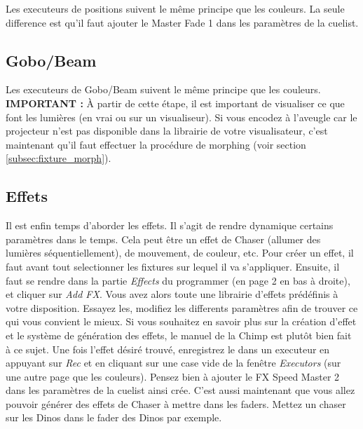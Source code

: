 Les executeurs de positions suivent le même principe que les couleurs. La seule
difference est qu'il faut ajouter le Master Fade 1 dans les paramètres de la cuelist.

\subsection{Gobo/Beam}
\label{subsec:exec_gobo_beam}

Les executeurs de Gobo/Beam suivent le même principe que les couleurs.
\newline
\newline
\textbf{IMPORTANT :} À partir de cette étape, il est important de visualiser ce que font les lumières (en vrai ou sur un visualiseur).
Si vous encodez à l'aveugle car le projecteur n'est pas disponible dans la librairie de votre visualisateur, c'est maintenant qu'il faut effectuer la procédure de morphing (voir section \ref{subsec:fixture_morph}).

\subsection{Effets}
\label{subsec:exec_effets}

Il est enfin temps d'aborder les effets.
\newline
Il s'agit de rendre dynamique certains paramètres dans le temps. Cela peut être un effet de Chaser (allumer des lumières séquentiellement), de mouvement, de couleur, etc.
\newline
\newline
Pour créer un effet, il faut avant tout selectionner les fixtures sur lequel il va s'appliquer.
Ensuite, il faut se rendre dans la partie \textit{Effects} du programmer (en page 2 en bas à droite),
et cliquer sur \textit{Add FX}. Vous avez alors toute une librairie d'effets prédéfinis à votre disposition.
Essayez les, modifiez les differents paramètres afin de trouver ce qui vous convient le mieux. Si vous
souhaitez en savoir plus sur la création d'effet et le système de génération des effets, le manuel de la Chimp est plutôt bien fait à ce sujet.
Une fois l'effet désiré trouvé, enregistrez le dans un executeur en appuyant sur \textit{Rec} et en cliquant sur une case vide de la fenêtre \textit{Executors} (sur une autre page que les couleurs).
Pensez bien à ajouter le FX Speed Master 2 dans les paramètres de la cuelist ainsi crée.
\newline
\newline
C'est aussi maintenant que vous allez pouvoir générer des effets de Chaser à mettre dans les faders. Mettez un chaser sur les Dinos dans
le fader des Dinos par exemple.


